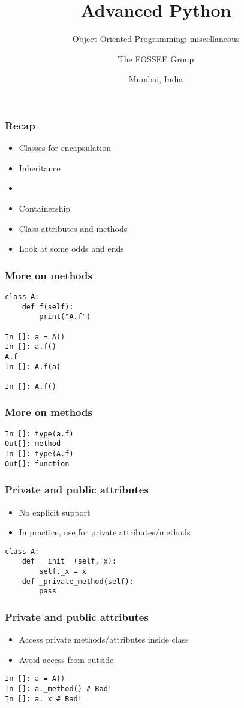\documentclass[14pt,compress,aspectratio=169]{beamer}
\title[OOP: Miscellaneous]{Advanced Python}
\subtitle{Object Oriented Programming: miscellaneous}
\author[FOSSEE] {The FOSSEE Group}
\institute[IIT Bombay] {Department of Aerospace Engineering\\IIT Bombay}
\date[] {Mumbai, India}
\begin{document}
\begin{frame}
  \titlepage
\end{frame}

\begin{frame}
  \frametitle{Recap}
  \begin{itemize}
  \item Classes for encapsulation
  \item Inheritance
  \item {}
  \item Containership
  \item Class attributes and methods
    \vspace*{0.3in}
  \item Look at some odds and ends
  \end{itemize}
\end{frame}

\begin{frame}[fragile]
  \frametitle{More on methods}
\begin{lstlisting}
class A:
    def f(self):
        print("A.f")

In []: a = A()
In []: a.f()
A.f
In []: A.f(a)

In []: A.f()
\end{lstlisting}
\end{frame}

\begin{frame}[fragile]
  \frametitle{More on methods}
\begin{lstlisting}
In []: type(a.f)
Out[]: method
In []: type(A.f)
Out[]: function
\end{lstlisting}
\end{frame}

\begin{frame}[fragile]
  \frametitle{Private and public attributes}
  \begin{itemize}
  \item No explicit support
  \item In practice, use  for private attributes/methods
  \end{itemize}
\begin{lstlisting}
class A:
    def __init__(self, x):
        self._x = x
    def _private_method(self):
        pass
\end{lstlisting}
\end{frame}

\begin{frame}[fragile]
  \frametitle{Private and public attributes}
  \begin{itemize}
  \item Access private methods/attributes inside class
  \item Avoid access from outside
  \end{itemize}

\begin{lstlisting}
In []: a = A()
In []: a._method() # Bad!
In []: a._x # Bad!
\end{lstlisting}
\end{frame}
\end{document}

